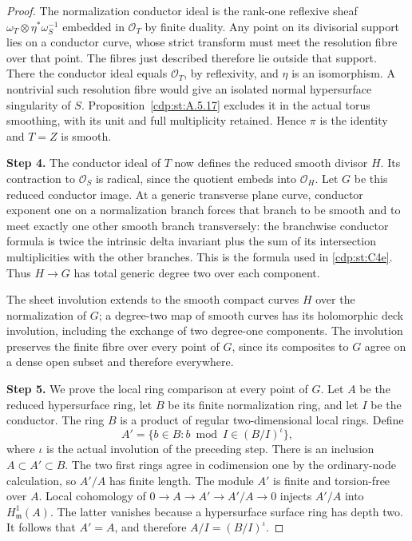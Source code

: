 \begin{proof}
The normalization conductor ideal is the rank-one reflexive
sheaf $\omega_T\otimes\eta^*\omega_S^{-1}$ embedded in
$\mathcal O_T$ by finite duality.  Any point on its divisorial
support lies on a conductor curve, whose strict transform
must meet the resolution fibre over that point.  The fibres
just described therefore lie outside that support.  There
the conductor ideal equals $\mathcal O_T$, by reflexivity,
and $\eta$ is an isomorphism.  A nontrivial such resolution
fibre would give an isolated normal hypersurface singularity
of $S$.  Proposition~\ref{cdp:st:A.5.17} excludes it in the
actual torus smoothing, with its unit and full multiplicity
retained.  Hence $\pi$ is the identity and $T=Z$ is smooth.

\noindent\textbf{Step 4.} The conductor ideal of $T$ now
defines the reduced smooth divisor $H$.  Its contraction to
$\mathcal O_S$ is radical, since the quotient embeds into
$\mathcal O_H$.  Let $G$ be this reduced conductor image.
At a generic transverse plane curve, conductor exponent one
on a normalization branch forces that branch to be smooth
and to meet exactly one other smooth branch transversely:
the branchwise conductor formula is twice the intrinsic
delta invariant plus the sum of its intersection
multiplicities with the other branches.  This is the
formula used in \ref{cdp:st:C4e}.  Thus $H\to G$ has total
generic degree two over each component.

The sheet involution extends to the smooth compact curves
$H$ over the normalization of $G$; a degree-two map of
smooth curves has its holomorphic deck involution, including
the exchange of two degree-one components.  The involution
preserves the finite fibre over every point of $G$, since
its composites to $G$ agree on a dense open subset and
therefore everywhere.

\noindent\textbf{Step 5.} We prove the local ring comparison
at every point of $G$.  Let $A$ be the reduced hypersurface
ring, let $B$ be its finite normalization ring, and let $I$
be the conductor.  The ring $B$ is a product of regular
two-dimensional local rings.  Define
\[
 A'=\{b\in B:b\bmod I\in(B/I)^\iota\},
\]
where $\iota$ is the actual involution of the preceding
step.  There is an inclusion $A\subset A'\subset B$.
The two first rings agree in codimension one by the
ordinary-node calculation, so $A'/A$ has finite length.
The module $A'$ is finite and torsion-free over $A$.
Local cohomology of $0\to A\to A'\to A'/A\to0$ injects
$A'/A$ into $H^1_{\mathfrak m}(A)$.  The latter vanishes
because a hypersurface surface ring has depth two.
It follows that $A'=A$, and therefore
$A/I=(B/I)^\iota$.


\end{proof}
